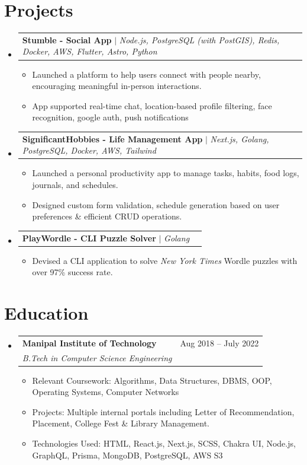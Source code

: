 \documentclass[letterpaper,11pt]{article}
\makeatletter
\newcommand{\resumeItem}[1]{
  \item\footnotesize{
    {#1 \vspace{-2pt}}
  }
}
\newcommand{\resumeSubheading}[4]{
  \vspace{-2pt}\item[]
    \begin{tabular*}{0.97\textwidth}[t]{l@{\extracolsep{\fill}}r}
      \textbf{#1} & #2 \\
      \textit{\small#3} & \textit{\small #4} \\
    \end{tabular*}\vspace{-4pt}
}
\newcommand{\resumeProjectHeading}[2]{
    \item[]
    \begin{tabular*}{0.97\textwidth}{l@{\extracolsep{\fill}}r}
      \small#1 & #2 \\
    \end{tabular*}\vspace{-7pt}
}
\newcommand{\resumeSubHeadingListStart}{\begin{itemize}[leftmargin=0.15in]}
\newcommand{\resumeSubHeadingListEnd}{\end{itemize}}
\newcommand{\resumeItemListStart}{\begin{itemize}[leftmargin=0.15in]}
\newcommand{\resumeItemListEnd}{\end{itemize}\vspace{-5pt}}
\makeatother
\begin{document}
\section{Projects}
  \resumeSubHeadingListStart
    \resumeProjectHeading
      {\textbf{Stumble - Social App} $|$ \emph{Node.js, PostgreSQL (with PostGIS), Redis, Docker, AWS, Flutter, Astro, Python}}{}
      \resumeItemListStart
        \resumeItem{Launched a platform to help users connect with people nearby, encouraging meaningful in-person interactions.}
        \resumeItem{App supported real-time chat, location-based profile filtering, face recognition, google auth, push notifications}
      \resumeItemListEnd

    \resumeProjectHeading
{\textbf{SignificantHobbies - Life Management App} $|$ \emph{Next.js, Golang, PostgreSQL, Docker, AWS, Tailwind}}{}
\resumeItemListStart
  \resumeItem{Launched a personal productivity app to manage tasks, habits, food logs, journals, and schedules.}
  \resumeItem{Designed custom form validation, schedule generation based on user preferences \& efficient CRUD operations.}
\resumeItemListEnd
    \resumeProjectHeading
      {\textbf{PlayWordle - CLI Puzzle Solver} $|$ \emph{Golang}}{}
      \resumeItemListStart
        \resumeItem{Devised a CLI application to solve \emph{New York Times} Wordle puzzles with over 97\% success rate.}
      \resumeItemListEnd


  \resumeSubHeadingListEnd



\section{Education}
  \resumeSubHeadingListStart
    \resumeSubheading
      {Manipal Institute of Technology}{Aug 2018 -- July 2022}
      {B.Tech in Computer Science Engineering}{}
    \resumeItemListStart
      \resumeItem{Relevant Coursework: Algorithms, Data Structures, DBMS, OOP, Operating Systems, Computer Networks}
      \resumeItem{Projects: Multiple internal portals including Letter of Recommendation, Placement, College Fest \& Library Management.}
      \resumeItem{Technologies Used: HTML, React.js, Next.js, SCSS, Chakra UI, Node.js, GraphQL, Prisma, MongoDB, PostgreSQL, AWS S3}
    \resumeItemListEnd
  \resumeSubHeadingListEnd
\end{document}
